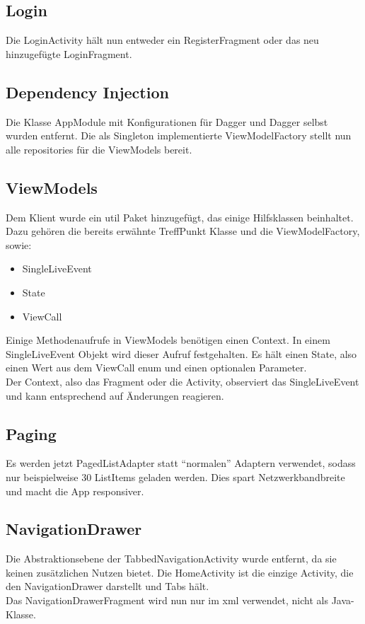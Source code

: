 \documentclass[parskip=full,11pt]{scrartcl}
\begin{document}
\subsection{Login}
Die LoginActivity hält nun entweder ein RegisterFragment oder das neu
hinzugefügte LoginFragment.

\subsection{Dependency Injection}
Die Klasse AppModule mit Konfigurationen für Dagger und Dagger selbst
wurden entfernt. Die als Singleton implementierte ViewModelFactory stellt
nun alle repositories für die ViewModels bereit.

\subsection{ViewModels}
Dem Klient wurde ein util Paket hinzugefügt, das einige Hilfsklassen beinhaltet.\\
Dazu gehören die bereits erwähnte TreffPunkt Klasse und die
ViewModelFactory, sowie:
\begin{itemize}
\item
SingleLiveEvent

\item
State

\item
ViewCall

\end{itemize} 
Einige Methodenaufrufe in ViewModels benötigen einen Context. In einem
SingleLiveEvent Objekt wird dieser Aufruf festgehalten. Es hält einen State,
also einen Wert aus dem ViewCall enum und einen optionalen Parameter.\\
Der Context, also das Fragment oder die Activity, observiert das SingleLiveEvent und
kann entsprechend auf Änderungen reagieren.


\subsection{Paging}
Es werden jetzt PagedListAdapter statt \enquote{normalen} Adaptern verwendet,
sodass nur beispielweise 30 ListItems geladen werden. Dies spart Netzwerkbandbreite
und macht die App responsiver.

\subsection{NavigationDrawer}
Die Abstraktionsebene der TabbedNavigationActivity wurde entfernt, da
sie keinen zusätzlichen Nutzen bietet. Die HomeActivity ist die einzige
Activity, die den NavigationDrawer darstellt und Tabs hält.\\
Das NavigationDrawerFragment wird nun nur im xml verwendet, nicht als Java-Klasse.
\end{document}
